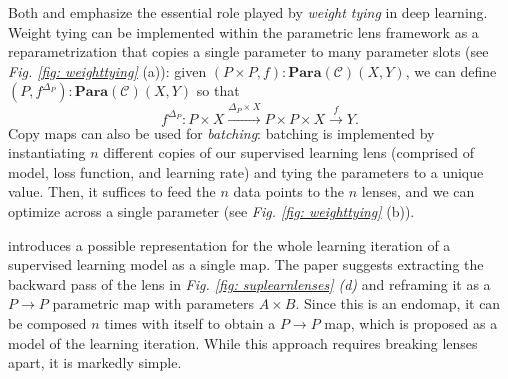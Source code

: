\documentclass[11pt,a4paper,openright,twoside]{report}
\theoremstyle{plain}
\theoremstyle{definition}
\begin{document}
Both \cite{cruttwell2022categorical} and \cite{gavranovic2024fundamental} emphasize the essential role played by \textit{weight tying} in deep learning. Weight tying can be implemented within the parametric lens framework as a reparametrization that copies a single parameter to many parameter slots (see \textit{Fig. \ref{fig: weighttying}} (a)): given $(P \times P, f): \mathbf{Para}(\mathcal{C})(X,Y)$, we can define $(P, f^{\Delta_P}): \mathbf{Para}(\mathcal{C})(X,Y)$ so that
\[f^{\Delta_P}: P \times X \stackrel{\Delta_P \times X}{\longrightarrow} P \times P \times X \stackrel{f}{\longrightarrow} Y.\]
Copy maps can also be used for \textit{batching}: batching is implemented by instantiating $n$ different copies of our supervised learning lens (comprised of model, loss function, and learning rate) and tying the parameters to a unique value. Then, it suffices to feed the $n$ data points to the $n$ lenses, and we can optimize across a single parameter (see \textit{Fig. \ref{fig: weighttying}} (b)).

\cite{cruttwell2022categorical} introduces a possible representation for the whole learning iteration of a supervised learning model as a single map. The paper suggests extracting the backward pass of the lens in \textit{Fig. \ref{fig: suplearnlenses} (d)} and reframing it as a $P \to P$ parametric map with parameters $A \times B$. Since this is an endomap, it can be composed $n$ times with itself to obtain a $P \to P$ map, which is proposed as a model of the learning iteration. While this approach requires breaking lenses apart, it is markedly simple.
\end{document}
